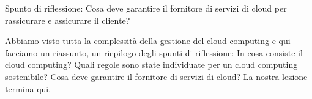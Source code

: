 Spunto di riflessione: Cosa deve garantire il fornitore di servizi di cloud per rassicurare e assicurare il cliente? 

Abbiamo visto tutta la complessità della gestione del cloud computing e qui facciamo un riassunto, un riepilogo degli spunti di riflessione: 
In cosa consiste il cloud computing? 
Quali regole sono state individuate per un cloud computing sostenibile? 
Cosa deve garantire il fornitore di servizi di cloud? La nostra lezione termina qui. 